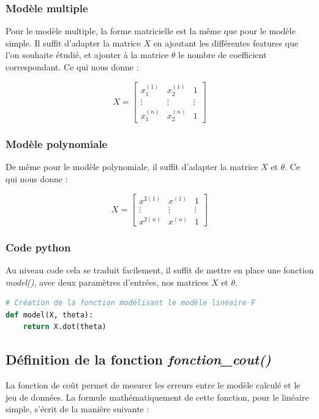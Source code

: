 \documentclass[french]{article}
\begin{document}
\subsubsection{Modèle multiple}

Pour le modèle multiple, la forme matricielle est la même que pour le modèle simple. Il suffit d'adapter la matrice $X$ en ajoutant les différentes features que l'on souhaite étudié, et ajouter à la matrice $\theta$ le nombre de coefficient correspondant. Ce qui nous donne :

$$X = \begin{bmatrix}
    x_{1}^{(1)} & x_{2}^{(1)} & 1 \\
    \vdots & \vdots & \vdots\\
    x_{1}^{(n)} & x_{2}^{(n)} & 1
\end{bmatrix}$$

\subsubsection{Modèle polynomiale}

De même pour le modèle polynomiale, il suffit d'adapter la matrice $X$ et $\theta$. Ce qui nous donne :

$$X = \begin{bmatrix}
    x^{2 (1)} & x^{(1)} & 1 \\
    \vdots & \vdots & \vdots \\
    x^{2 (n)} & x^{(n)} & 1
\end{bmatrix}$$

\subsubsection{Code python}
\noindent Au niveau code cela se traduit facilement, il suffit de mettre en place une fonction \textit{model()}, avec deux paramètres d'entrées, nos matrices $X$ et $\theta$.\\

\begin{lstlisting}[language=Python]
# Création de la fonction modélisant le modèle linéaire F
def model(X, theta):
    return X.dot(theta)
\end{lstlisting}

\subsection{Définition de la fonction \textit{fonction\_cout()}}
La fonction de coût permet de mesurer les erreurs entre le modèle calculé et le jeu de données. La formule mathématiquement de cette fonction, pour le linéaire simple, s'écrit de la manière suivante : 
\end{document}
